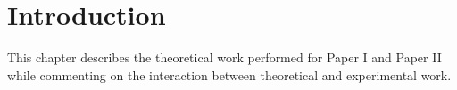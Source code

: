 \section{Introduction}
\label{sec:borohydrides-introduction}

This chapter describes the theoretical work performed for Paper I and Paper II while commenting on the interaction between theoretical and experimental work.

\placeholder
